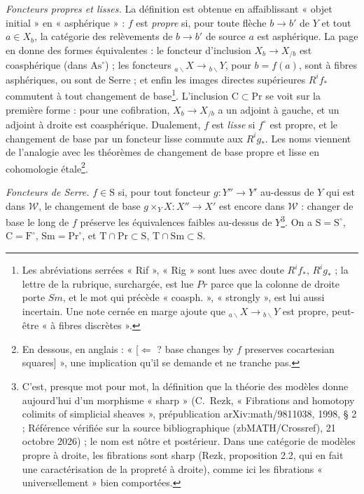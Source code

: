 \documentclass[11pt,a4paper]{article}
\begin{document}
\emph{Foncteurs propres et lisses.} La définition est obtenue en affaiblissant
« objet initial » en « asphérique » : $f$ est \emph{propre} si, pour toute flèche
$b \to b'$ de $Y$ et tout $a \in X_{b}$, la catégorie des relèvements de
$b \to b'$ de source $a$ est asphérique. La page en donne des formes
équivalentes : le foncteur d'inclusion $X_{b} \to X_{/b}$ est coasphérique
(dans $\mathrm{As}^{\circ}$) ; les foncteurs ${}_{a\backslash}X \to
{}_{b\backslash}Y$, pour $b = f(a)$, sont à fibres asphériques, ou sont de
Serre ; et enfin les images directes supérieures $R^{i}f_{*}$ commutent à tout
changement de base\footnote{Les abréviations serrées « Rif », « Rig » sont lues
avec doute $R^{i}f_{*}$, $R^{i}g_{*}$ ; la lettre de la rubrique, surchargée,
est lue $Pr$ parce que la colonne de droite porte $Sm$, et le mot qui précède
« coasph. », « strongly », est lui aussi incertain. Une note cernée en marge
ajoute que ${}_{a\backslash}X \to {}_{b\backslash}Y$ est propre, peut-être « à
fibres discrètes ».}. L'inclusion $\mathrm{C} \subset \mathrm{Pr}$ se voit
sur la première forme : pour une cofibration, $X_{b} \to X_{/b}$ a un adjoint à
gauche, et un adjoint à droite est coasphérique. Dualement, $f$ est
\emph{lisse} si $f^{\circ}$ est propre, et le changement de base par un
foncteur lisse commute aux $R^{i}g_{*}$. Les noms viennent de l'analogie avec
les théorèmes de changement de base propre et lisse en cohomologie
étale\footnote{En dessous, en anglais : « [$\Longleftarrow$ ? base changes by
$f$ preserves cocartesian squares] », une implication qu'il se demande et ne
tranche pas.}.

\emph{Foncteurs de Serre.} $f \in \mathrm{S}$ si, pour tout foncteur
$g : Y'' \to Y'$ au-dessus de $Y$ qui est dans $\mathcal{W}$, le changement de
base $g \times_{Y} X : X'' \to X'$ est encore dans $\mathcal{W}$ : changer de
base le long de $f$ préserve les équivalences faibles au-dessus de
$Y$\footnote{C'est, presque mot pour mot, la définition que la théorie des
modèles donne aujourd'hui d'un morphisme « sharp » (C.~Rezk, « Fibrations and homotopy colimits of simplicial sheaves », prépublication arXiv:math/9811038, 1998, § 2 ; Référence vérifiée sur la source bibliographique (zbMATH/Crossref), 21 octobre 2026) ; le nom est
nôtre et postérieur. Dans une catégorie de modèles propre à droite, les fibrations sont sharp (Rezk, proposition 2.2, qui en fait une caractérisation de la propreté à droite), comme ici les fibrations « universellement » bien
comportées.}. On a $\mathrm{S} = \mathrm{S}^{\circ}$, $\mathrm{C} =
\mathrm{F}^{\circ}$, $\mathrm{Sm} = \mathrm{Pr}^{\circ}$, et
$\mathrm{T} \cap \mathrm{Pr} \subset \mathrm{S}$,
$\mathrm{T} \cap \mathrm{Sm} \subset \mathrm{S}$.
\end{document}
